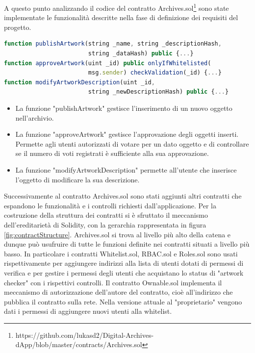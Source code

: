 A questo punto analizzando il codice del contratto Archives.sol\footnote{https://github.com/lukasd2/Digital-Archives-dApp/blob/master/contracts/Archives.sol} sono state implementate le funzionalità descritte nella fase di definizione dei requisiti del progetto.
\\
\begin{lstlisting}[caption={Funzioni principali del contratto Archives.sol},language=JavaScript]
function publishArtwork(string _name, string _descriptionHash, 
                        string _dataHash) public {...}
function approveArtwork(uint _id) public onlyIfWhitelisted(
                        msg.sender) checkValidation(_id) {...}
function modifyArtworkDescription(uint _id, 
                        string _newDescriptionHash) public {...}
\end{lstlisting}

\begin{itemize}
\item La funzione "publishArtwork" gestisce l'inserimento di un nuovo oggetto nell'archivio.
\item La funzione "approveArtwork" gestisce l'approvazione degli oggetti inserti. Permette agli utenti autorizzati di votare per un dato oggetto e di controllare se il numero di voti registrati è sufficiente alla sua approvazione.
\item La funzione "modifyArtworkDescription" permette all'utente che inserisce l'oggetto di modificare la sua descrizione.
\end{itemize}

Successivamente al contratto Archives.sol sono stati aggiunti altri contratti che espandono le funzionalità e i controlli richiesti dall'applicazione. Per la costruzione della struttura dei contratti si è sfruttato il meccanismo dell'ereditarietà di Solidity, con la gerarchia rappresentata in figura \ref{fig:contractStructure}. Archives.sol si trova al livello più alto della catena e dunque può usufruire di tutte le funzioni definite nei contratti situati a livello più basso. In particolare i contratti Whitelist.sol, RBAC.sol e Roles.sol sono usati rispettivamente per aggiungere indirizzi alla lista di utenti dotati di permessi di verifica e per gestire i permessi degli utenti che acquistano lo status di "artwork checker" con i rispettivi controlli.
Il contratto Ownable.sol implementa il meccanismo di autorizzazione dell'autore del contratto, cioè all'indirizzo che pubblica il contratto sulla rete. Nella versione attuale al "proprietario" vengono dati i permessi di aggiungere nuovi utenti alla whitelist. 

